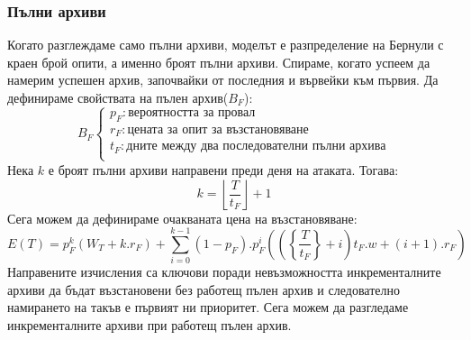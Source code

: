 \documentclass[11pt, a4paper]{article}
\theoremstyle{definition}
\begin{document}
			\subsubsection{Пълни архиви}
				Когато разглеждаме само пълни архиви, моделът е разпределение на Бернули с краен брой опити, а именно броят пълни архиви. Спираме, когато успеем да намерим успешен архив, започвайки от последния и вървейки към първия. Да дефинираме свойствата на пълен архив($B_F$):
				$$
				B_F
				\begin{cases}
				p_F: \text{вероятността за провал}\\
				r_F: \text{цената за опит за възстановяване}\\
				t_F: \text{дните между два последователни пълни архива}\\
				\end{cases}
				$$
				Нека $k$ е броят пълни архиви направени преди деня на атаката. Тогава:
				$$
				k = \left \lfloor{\frac{T}{t_F}}\right \rfloor + 1
				$$
				Сега можем да дефинираме очакваната цена на възстановяване:
				\begin{equation}
					\label{eq:1}
					E(T) = p_F^{k}\left(W_T + k.r_F\right) + \displaystyle \sum_{i=0}^{k-1} 	(1-p_F).p_F^{i}\left( \left (\left\{ \frac{T}{t_F}\right \} + i\right)t_F.w + (i+1).r_F \right )
				\end{equation}
				Направените изчисления са ключови поради невъзможността инкременталните архиви да бъдат възстановени без работещ пълен архив и следователно намирането на такъв е първият ни приоритет. Сега можем да разгледаме инкременталните архиви при работещ пълен архив.
\end{document}
